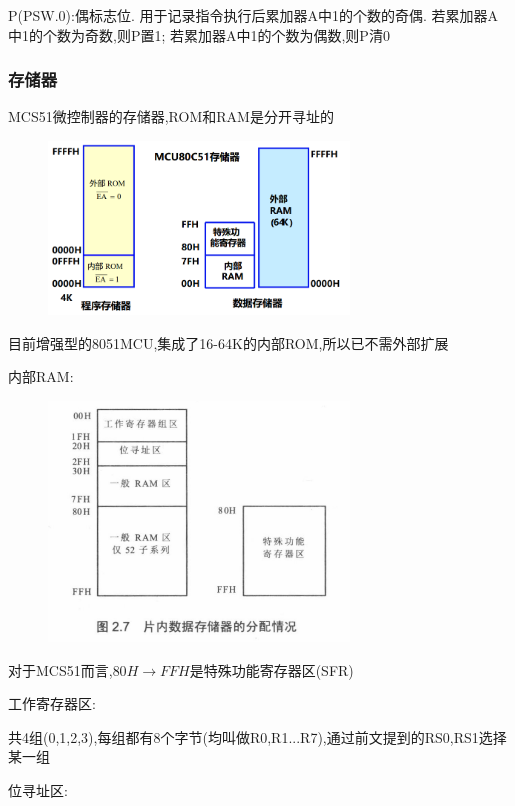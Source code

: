 \documentclass[12pt,a4paper,oneside]{ctexart}
\begin{document}
P(PSW.0):偶标志位.
用于记录指令执行后累加器A中1的个数的奇偶.
若累加器A中1的个数为奇数,则P置1;
若累加器A中1的个数为偶数,则P清0

\subsubsection{存储器}
MCS51微控制器的存储器,ROM和RAM是分开寻址的
\begin{figure}[H]
    \centering
    \includegraphics[width=8cm]{photos/存储器结构图.png}
\end{figure}

目前增强型的8051MCU,集成了16-64K的内部ROM,所以已不需外部扩展

内部RAM:
\begin{figure}[H]
    \centering
    \includegraphics[width=8cm]{photos/内部RAM.png}
\end{figure}
对于MCS51而言,$80H\to FFH$是特殊功能寄存器区(SFR)

工作寄存器区:

共4组(0,1,2,3),每组都有8个字节(均叫做R0,R1...R7),通过前文提到的RS0,RS1选择某一组

位寻址区:
\end{document}
